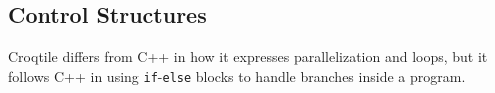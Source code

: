 \subsection*{Control Structures}

Croqtile differs from C++ in how it expresses parallelization and loops, but it follows C++ in using \texttt{if}-\texttt{else} blocks to handle branches inside a program.
